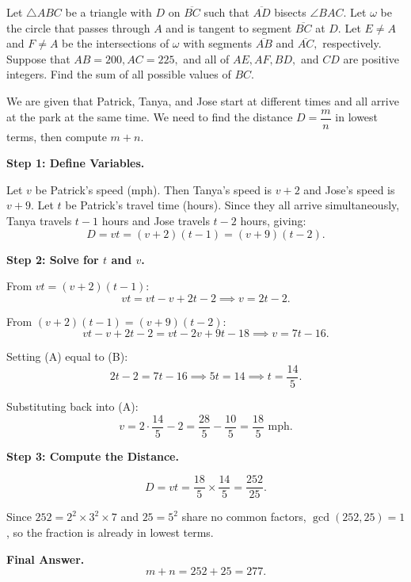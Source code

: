 \documentclass{article}
\begin{document}
\clearpage

\begin{tcolorbox}[title=Question, breakable]
\label{resoning chains}
Let $\triangle ABC$ be a triangle with $D$ on $\overline{BC}$ such that $\overline{AD}$ bisects $\angle BAC.$ Let $\omega$ be the circle that passes through $A$ and is tangent to segment $\overline{BC}$ at $D.$ Let $E \neq A$ and $F \neq A$ be the intersections of $\omega$ with segments $\overline{AB}$ and $\overline{AC},$ respectively. Suppose that $AB = 200, AC = 225,$ and all of $AE, AF, BD,$ and $CD$ are positive integers. Find the sum of all possible values of $BC.$
\end{tcolorbox}

\begin{tcolorbox}[title=Base Model, breakable]
We are given that Patrick, Tanya, and Jose start at different times and all                                                                                                    
arrive at the park at the same time. We need to find the distance $D = \dfrac{m}{n}$                                                                                           
in lowest terms, then compute $m+n$.                                                                                                                                           

\medskip                                                                                                                                                                       
\textbf{Step 1: Define Variables.}

Let $v$ be Patrick's speed (mph). Then Tanya's speed is $v+2$ and Jose's speed
is $v+9$. Let $t$ be Patrick's travel time (hours). Since they all arrive
simultaneously, Tanya travels $t-1$ hours and Jose travels $t-2$ hours, giving:
\[
D = vt = (v+2)(t-1) = (v+9)(t-2).
\]

\medskip
\textbf{Step 2: Solve for $t$ and $v$.}

From $vt = (v+2)(t-1)$:
\[
vt = vt - v + 2t - 2 \implies v = 2t-2. \tag{A}
\]

From $(v+2)(t-1) = (v+9)(t-2)$:
\[
vt - v + 2t - 2 = vt - 2v + 9t - 18 \implies v = 7t - 16. \tag{B}
\]

Setting (A) equal to (B):
\[
2t - 2 = 7t - 16 \implies 5t = 14 \implies t = \frac{14}{5}.
\]

Substituting back into (A):
\[
v = 2\cdot\frac{14}{5} - 2 = \frac{28}{5} - \frac{10}{5} = \frac{18}{5} \text{ mph}.
\]

\medskip
\textbf{Step 3: Compute the Distance.}

\[
D = vt = \frac{18}{5} \times \frac{14}{5} = \frac{252}{25}.
\]

Since $252 = 2^2\times 3^2\times 7$ and $25 = 5^2$ share no common factors,                                                                                                    
$\gcd(252,25)=1$, so the fraction is already in lowest terms.
      
\medskip        
\textbf{Final Answer.}
\[
m + n = 252 + 25 = \boxed{277}.
\]
\end{tcolorbox}
\end{document}
